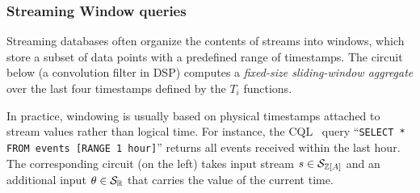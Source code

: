 
\subsubsection{Streaming Window queries}

Streaming databases often organize the contents of streams into windows, which store a subset of data points with a predefined range of timestamps.
The circuit below (a convolution filter in DSP) computes a \emph{fixed-size sliding-window aggregate}
over the last four timestamps defined by the $T_i$ functions.

\begin{center}
\end{center}

In practice, windowing is usually based on physical timestamps attached to
stream values rather than logical time.  For instance, the CQL~\cite{arasu-tr02} query
``\texttt{SELECT * FROM events [RANGE 1 hour]}'' returns all events received
within the last hour.  The corresponding circuit (on the left) takes input stream $s \in \mathcal{S}_{\mathbb{Z}[A]}$ and an additional
input $\theta \in \mathcal{S}_{\mathbb{R}}$ that carries the value of the current
time.

